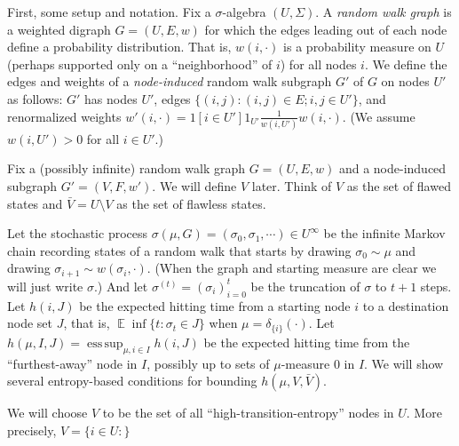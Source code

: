 \documentclass{article}
\newcommand{\hasDist}%
  {\sim}
\DeclareMathOperator*{\E}%
  {\mathbb{E}}
\DeclareMathOperator*{\esssup}{ess\,sup}
\begin{document}
First, some setup and notation.  Fix a $\sigma$-algebra $(U, \Sigma)$.  A \emph{random walk graph} is a weighted digraph $G = (U, E, w)$ for which the edges leading out of each node define a probability distribution.  That is, $w(i, \cdot)$ is a probability measure on $U$ (perhaps supported only on a ``neighborhood'' of $i$) for all nodes $i$.  We define the edges and weights of a \emph{node-induced} random walk subgraph $G'$ of $G$ on nodes $U'$ as follows: $G'$ has nodes $U'$, edges $\{(i,j): (i,j) \in E; i, j \in U'\}$, and renormalized weights $w'(i, \cdot) = 1[i \in U'] 1_{U'} \frac{1}{w(i, U')} w(i, \cdot)$.  (We assume $w(i, U') > 0$ for all $i \in U'$.)

Fix a (possibly infinite) random walk graph $G = (U, E, w)$ and a node-induced subgraph $G' = (V, F, w')$.  We will define $V$ later.  Think of $V$ as the set of flawed states and $\bar{V} = U \setminus V$ as the set of flawless states.

Let the stochastic process $\sigma(\mu, G) = (\sigma_0, \sigma_1, \cdots) \in U^\infty$ be the infinite Markov chain recording states of a random walk that starts by drawing $\sigma_0 \hasDist \mu$ and drawing $\sigma_{i+1} \hasDist w(\sigma_i, \cdot)$.  (When the graph and starting measure are clear we will just write $\sigma$.)  And let $\sigma^(t) = (\sigma_i)_{i=0}^{t}$ be the truncation of $\sigma$ to $t+1$ steps.  Let $h(i, J)$ be the expected hitting time from a starting node $i$ to a destination node set $J$, that is, $\E \inf \{t: \sigma_t \in J\}$ when $\mu = \delta_{\{i\}}(\cdot)$.  Let $h(\mu, I, J) = \esssup_{\mu, i \in I} h(i, J)$ be the expected hitting time from the ``furthest-away'' node in $I$, possibly up to sets of $\mu$-measure $0$ in $I$.  We will show several entropy-based conditions for bounding $h(\mu, V, \bar{V})$.

We will choose $V$ to be the set of all ``high-transition-entropy'' nodes in $U$.  More precisely, $V = \{i \in U: \}$ %

\end{document}
